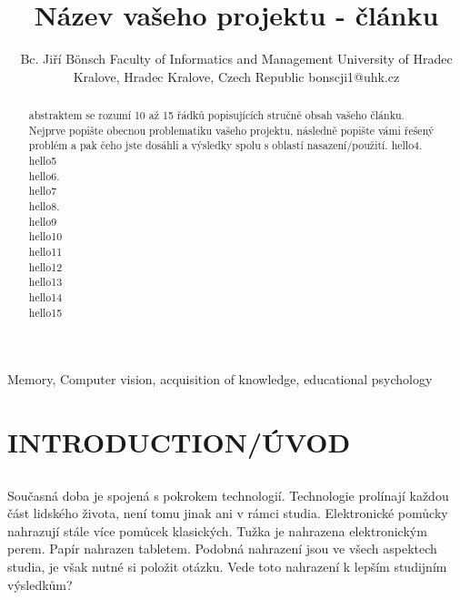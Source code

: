 \documentclass[journal]{IEEEtran}
\title{Název vašeho projektu - článku}
\author{Bc. Jiří Bönsch
        \linebreak
        Faculty of Informatics and Management
        \linebreak
        University of Hradec Kralove,
        \linebreak
        Hradec Kralove, Czech Republic
        \linebreak
        bonscji1@uhk.cz

}
\begin{document}
\maketitle

\begin{abstract} %
        abstraktem se rozumí 10 až 15 řádků popisujících stručně obsah vašeho článku. Nejprve popište obecnou problematiku vašeho projektu, následně popište vámi řešený problém a pak čeho jste dosáhli a výsledky spolu s oblastí nasazení/použití.
        hello4.\\
        hello5\\
        hello6.\\
        hello7\\
        hello8.\\
        hello9\\
        hello10\\
        hello11\\
        hello12\\
        hello13\\
        hello14\\
        hello15\\

\end{abstract}

\begin{IEEEkeywords} %
Memory, Computer vision, acquisition of knowledge, educational psychology
\end{IEEEkeywords}


\IEEEpeerreviewmaketitle



\section{INTRODUCTION/ÚVOD}

\subsection{}
Současná doba je spojená s pokrokem technologií.
Technologie prolínají každou část lidského života, není tomu jinak ani v rámci studia.
Elektronické pomůcky nahrazují stále více pomůcek klasických.
Tužka je nahrazena elektronickým perem. Papír nahrazen tabletem.
Podobná nahrazení jsou ve všech aspektech studia, je však nutné si položit otázku.
Vede toto nahrazení  k lepším studijním výsledkům?
\end{document}
